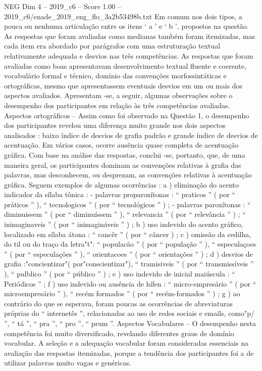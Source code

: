 \begin{textsample}{NEG Dim 4 – 2019\_c6 – Score 1.00 – 2019\_c6/enade\_2019\_eng\_flo\_3a2b53498b.txt}
Em comum nos dois tipos, a pouca ou nenhuma articulação entre os itens ‘ a ’ e ‘ b ’, propostos na questão.
As respostas que foram avaliadas como medianas também foram itemizadas, mas cada item era abordado por parágrafos com uma estruturação textual relativamente adequada e desvios nas três competências.
As respostas que foram avaliadas como boas apresentavam desenvolvimento textual fluente e coerente, vocabulário formal e técnico, domínio das convenções morfossintáticas e ortográficas, mesmo que apresentassem eventuais desvios em um ou mais dos aspectos avaliados.
Apresentam -se, a seguir, algumas observações sobre o desempenho dos participantes em relação às três competências avaliadas.
Aspectos ortográficos – Assim como foi observado na Questão 1, o desempenho dos participantes revelou uma diferença muito grande nos dois aspectos analisados : baixo índice de desvios de grafia padrão e grande índice de desvios de acentuação.
Em vários casos, ocorre ausência quase completa de acentuação gráfica.
Com base na análise das respostas, conclui -se, portanto, que, de uma maneira geral, os participantes dominam as convenções relativas à grafia das palavras, mas desconhecem, ou desprezam, as convenções relativas à acentuação gráfica.
Seguem exemplos de algumas ocorrências : a ) eliminação do acento indicador da sílaba tônica : - palavras proparoxítonas : “ praticos ” ( por “ práticos ” ), “ tecnologicos ” ( por “ tecnológicos ” ) ; - palavras paroxítonas : “ diminuissem ” ( por “ diminuíssem ” ), “ relevancia ” ( por “ relevância ” ) ; “ inimaginaveis ” ( por “ inimagináveis ” ) ; b ) uso indevido do acento gráfico, localizado em sílaba átona : “ cancêr ” ( por “ câncer ) ; c ) omissão da cedilha, do til ou do traço da letra"t": “ populacão ” ( por “ população ” ), “ especulaçoes ” ( por “ especulações ” ), “ orientacoes ” ( por “ orientações ” ) ; d ) desvios de grafia :"concientizar"( por"conscientizar"), “ tramisiveis ” ( por “ transmissíveis ” ), “ pulblico ” ( por “ público ” ) ; e ) uso indevido de inicial maiúscula : “ Periódicos ” ; f ) uso indevido ou ausência de hífen : “ micro-empresário ” ( por “ microempresário ” ), “ recém formados ” ( por “ recém-formados ” ) ; g ) ao contrário do que se esperava, foram poucas as ocorrências de abreviaturas próprias do “ internetês ”, relacionadas ao uso de redes sociais e emails, como"p/ ”, “ tá ”, “ pra ”, “ pro ”, “ prum ”.
Aspectos Vocabulares – O desempenho nesta competência foi muito diversificado, revelando diferentes graus de domínio vocabular.
A seleção e a adequação vocabular foram consideradas essenciais na avaliação das respostas itemizadas, porque a tendência dos participantes foi a de utilizar palavras muito vagas e genéricas.

\end{textsample}
